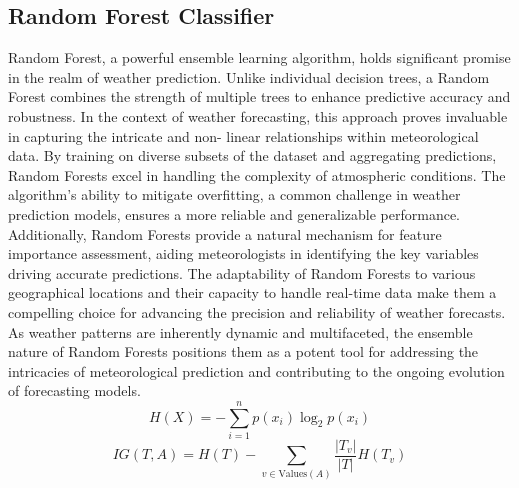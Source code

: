 \documentclass[conference]{IEEEtran}
\begin{document}
\subsection{\textbf{Random Forest Classifier}}
Random Forest, a powerful ensemble learning algorithm, holds significant promise in the realm of 	weather prediction. Unlike individual decision trees, 	a Random Forest combines the strength of multiple 	trees to enhance predictive accuracy and robustness. 	In the context of weather forecasting, this approach 	proves invaluable in capturing the intricate and non-	linear relationships within meteorological data. By 	training on diverse subsets of the dataset and 	aggregating predictions, Random Forests excel in 	handling the complexity of atmospheric conditions. 	The algorithm's ability to mitigate overfitting, a 	common challenge in weather prediction models, 	ensures a more reliable and generalizable 	performance. Additionally, Random Forests provide 	a natural mechanism for feature importance 	assessment, aiding meteorologists in identifying the 	key variables driving accurate predictions. The 	adaptability of Random Forests to various 	geographical locations and their capacity to handle 	real-time data make them a compelling choice for 	advancing the precision and reliability of weather 	forecasts. As weather patterns are inherently 	dynamic and multifaceted, the ensemble nature of 	Random Forests positions them as a potent tool for 	addressing the intricacies of meteorological 	prediction and contributing to the ongoing evolution 	of forecasting models.
\\  \[ H(X) = - \sum_{i=1}^{n} p(x_i) \log_2 p(x_i) \]
\[ IG(T, A) = H(T) - \sum_{v \in \text{Values}(A)} \frac{|T_v|}{|T|} H(T_v) \]
\end{document}
